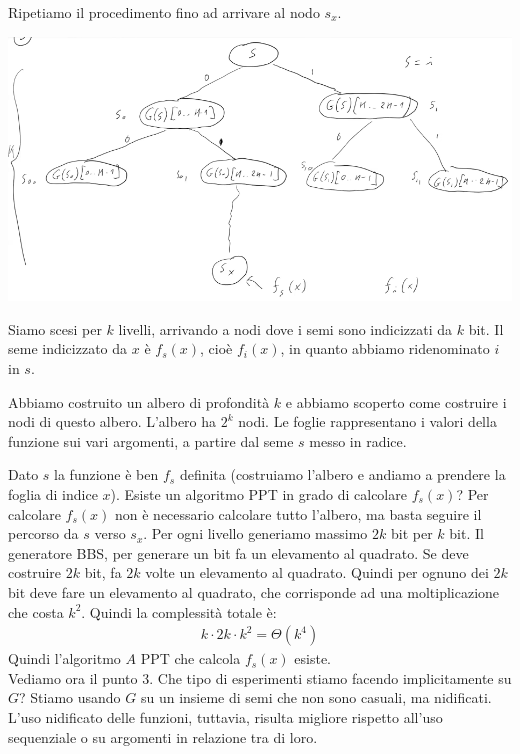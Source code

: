 \noindent Ripetiamo il procedimento fino ad arrivare al nodo $s_x$.
\begin{center}
    \includegraphics[width=1\textwidth]{images/fun5-3.png}
\end{center}

\noindent Siamo scesi per $k$ livelli, arrivando a nodi dove i semi sono indicizzati da $k$ bit. Il seme indicizzato da $x$ è $f_s(x)$, cioè $f_i(x)$, in quanto abbiamo ridenominato $i$ in $s$. 

Abbiamo costruito un albero di profondità $k$ e abbiamo scoperto come costruire i nodi di questo albero. L'albero ha $2^k$ nodi. Le foglie rappresentano i valori della funzione sui vari argomenti, a partire dal seme $s$ messo in radice. 

Dato $s$ la funzione è ben $f_s$ definita (costruiamo l'albero e andiamo a prendere la foglia di indice $x$). Esiste un algoritmo PPT in grado di calcolare $f_s(x)$? Per calcolare $f_s(x)$ non è necessario calcolare tutto l'albero, ma basta seguire il percorso da $s$ verso $s_x$. Per ogni livello generiamo massimo $2k$ bit per $k$ bit. Il generatore BBS, per generare un bit fa un elevamento al quadrato. Se deve costruire $2k$ bit, fa $2k$ volte un elevamento al quadrato. Quindi per ognuno dei $2k$ bit deve fare un elevamento al quadrato, che corrisponde ad una moltiplicazione che costa $k^2$. Quindi la complessità totale è:
\begin{align*}
    k \cdot 2k \cdot k^2 = \Theta(k^4)
\end{align*}
 \noindent Quindi l'algoritmo $A$ PPT che calcola $f_s(x)$ esiste. \\

 \noindent Vediamo ora il punto 3. Che tipo di esperimenti stiamo facendo implicitamente su $G$? Stiamo usando $G$ su un insieme di semi che non sono casuali, ma nidificati. L'uso nidificato delle funzioni, tuttavia, risulta migliore rispetto all'uso sequenziale o su argomenti in relazione tra di loro. 

